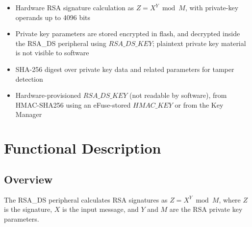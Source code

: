 \documentclass[main\_\_EN.tex]{subfiles}
\begin{document}
\begin{itemize}
\item Hardware RSA signature calculation as \begin{math}Z = X^{Y} \bmod M\end{math}, with private-key operands up to 4096 bits
\item Private key parameters are stored encrypted in flash, and decrypted inside the RSA\_DS peripheral using \begin{math}RSA\_DS\_KEY\end{math}; plaintext private key material is not visible to software
\item SHA-256 digest over private key data and related parameters for tamper detection
\item Hardware-provisioned \begin{math}RSA\_DS\_KEY\end{math} (not readable by software), from HMAC-SHA256 using an eFuse-stored \begin{math}HMAC\_KEY\end{math} or from the Key Manager
\end{itemize}
\section{Functional Description}
\subsection{Overview}

The RSA\_DS peripheral calculates RSA signatures as \begin{math}Z = X^{Y} \bmod M\end{math}, where \begin{math}Z\end{math} is the signature, \begin{math}X\end{math} is the input message, and \begin{math}Y\end{math} and \begin{math}M\end{math} are the RSA private key parameters.
\end{document}
